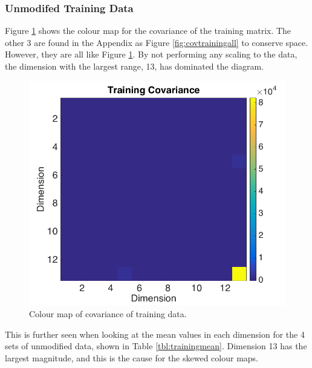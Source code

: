 \documentclass[a4paper, 10pt, conference]{ieeeconf}
\begin{document}
\subsubsection{Unmodifed Training Data}
Figure \ref{fig:covtrainingone} shows the colour map for the covariance of the training matrix. The other 3 are found in the Appendix as Figure \ref{fig:covtrainingall} to conserve space. However, they are all like Figure \ref{fig:covtrainingone}. By not performing any scaling to the data, the dimension with the largest range, 13, has dominated the diagram.

\begin{figure}[!ht]
    \centering
    \includegraphics[width=\linewidth]{pic/covtraining.png}
    \caption{Colour map of covariance of training data.}
    \label{fig:covtrainingone}
\end{figure}

This is further seen when looking at the mean values in each dimension for the 4 sets of unmodified data, shown in Table \ref{tbl:trainingmean}. Dimension 13 has the largest magnitude, and this is the cause for the skewed colour maps.
\end{document}
